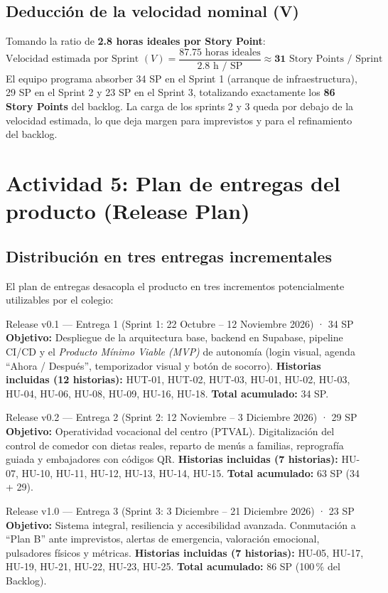 \documentclass[11pt,a4paper]{article}
\newcommand{\hl}[1]{\textcolor{gblue}{\textbf{#1}}}
\begin{document}
\subsection{Deducción de la velocidad nominal (V)}
Tomando la ratio de \textbf{2.8 horas ideales por Story Point}:
\[\text{Velocidad estimada por Sprint } (V) = \frac{87.75 \text{ horas ideales}}{2.8 \text{ h / SP}} \approx \textbf{31}\text{ Story Points / Sprint}\]
El equipo programa absorber 34 SP en el Sprint 1 (arranque de infraestructura), 29 SP en el Sprint 2 y 23 SP en el Sprint 3, totalizando exactamente los \hl{86 Story Points} del backlog. La carga de los sprints 2 y 3 queda por debajo de la velocidad estimada, lo que deja margen para imprevistos y para el refinamiento del backlog.

\section{Actividad 5: Plan de entregas del producto (Release Plan)}
\subsection{Distribución en tres entregas incrementales}
El plan de entregas desacopla el producto en tres incrementos potencialmente utilizables por el colegio:

\begin{verde}{Release v0.1 — Entrega 1 (Sprint 1: 22 Octubre – 12 Noviembre 2026) · 34 SP}
\textbf{Objetivo:} Despliegue de la arquitectura base, backend en Supabase, pipeline CI/CD y el \textit{Producto Mínimo Viable (MVP)} de autonomía (login visual, agenda ``Ahora / Después'', temporizador visual y botón de socorro). \textbf{Historias incluidas (12 historias):} HUT-01, HUT-02, HUT-03, HU-01, HU-02, HU-03, HU-04, HU-06, HU-08, HU-09, HU-16, HU-18. \textbf{Total acumulado:} 34 SP.
\end{verde}
\begin{verde}{Release v0.2 — Entrega 2 (Sprint 2: 12 Noviembre – 3 Diciembre 2026) · 29 SP}
\textbf{Objetivo:} Operatividad vocacional del centro (PTVAL). Digitalización del control de comedor con dietas reales, reparto de menús a familias, reprografía guiada y embajadores con códigos QR. \textbf{Historias incluidas (7 historias):} HU-07, HU-10, HU-11, HU-12, HU-13, HU-14, HU-15. \textbf{Total acumulado:} 63 SP (34 + 29).
\end{verde}
\begin{verde}{Release v1.0 — Entrega 3 (Sprint 3: 3 Diciembre – 21 Diciembre 2026) · 23 SP}
\textbf{Objetivo:} Sistema integral, resiliencia y accesibilidad avanzada. Conmutación a ``Plan B'' ante imprevistos, alertas de emergencia, valoración emocional, pulsadores físicos y métricas. \textbf{Historias incluidas (7 historias):} HU-05, HU-17, HU-19, HU-21, HU-22, HU-23, HU-25. \textbf{Total acumulado:} 86 SP (100\,\% del Backlog).
\end{verde}
\end{document}
